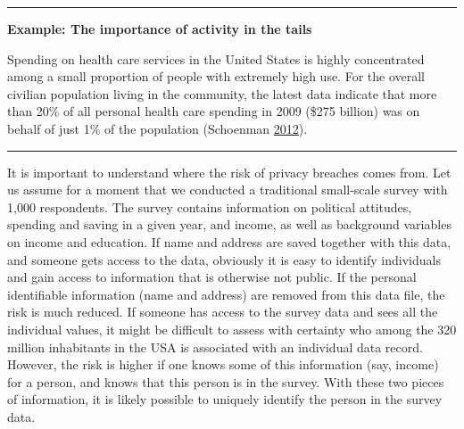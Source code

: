 \documentclass[]{krantz}
\begin{document}
\begin{center}\rule{0.5\linewidth}{\linethickness}\end{center}

\textbf{Example: The importance of activity in the tails}

Spending on health care services in the United States is highly
concentrated among a small proportion of people with extremely high use.
For the overall civilian population living in the community, the latest
data indicate that more than 20\% of all personal health care spending
in 2009 (\$275 billion) was on behalf of just 1\% of the population
(Schoenman \protect\hyperlink{ref-healthcarespending}{2012}).

\begin{center}\rule{0.5\linewidth}{\linethickness}\end{center}

It is important to understand where the risk of privacy breaches comes
from. Let us assume for a moment that we conducted a traditional
small-scale survey with 1,000 respondents. The survey contains
information on political attitudes, spending and saving in a given year,
and income, as well as background variables on income and education. If
name and address are saved together with this data, and someone gets
access to the data, obviously it is easy to identify individuals and
gain access to information that is otherwise not public. If the personal
identifiable information (name and address) are removed from this data
file, the risk is much reduced. If someone has access to the survey data
and sees all the individual values, it might be difficult to assess with
certainty who among the 320 million inhabitants in the USA is associated
with an individual data record. However, the risk is higher if one knows
some of this information (say, income) for a person, and knows that this
person is in the survey. With these two pieces of information, it is
likely possible to uniquely identify the person in the survey data.
\end{document}
